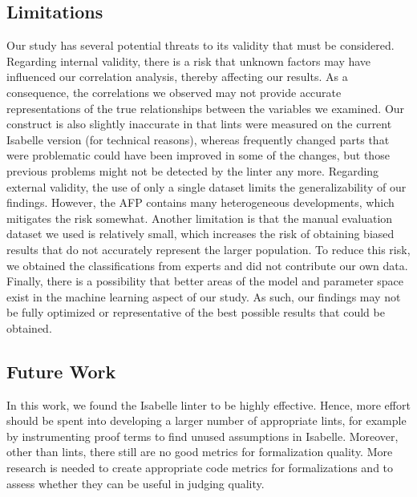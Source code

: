 \subsection{Limitations}
Our study has several potential threats to its validity that must be considered.
Regarding internal validity,
there is a risk that unknown factors may have influenced our correlation analysis,
thereby affecting our results.
As a consequence, the correlations we observed may not provide accurate representations of the true relationships between the variables we examined.
Our construct is also slightly inaccurate in that lints were measured on the current Isabelle version (for technical reasons),
whereas frequently changed parts that were problematic could have been improved in some of the changes,
but those previous problems might not be detected by the linter any more.
Regarding external validity, the use of only a single dataset limits the generalizability of our findings.
However, the AFP contains many heterogeneous developments, which mitigates the risk somewhat.
Another limitation is that the manual evaluation dataset we used is relatively small,
which increases the risk of obtaining biased results that do not accurately represent the larger population.
To reduce this risk,
we obtained the classifications from experts and did not contribute our own data.
Finally, there is a possibility that better areas of the model and parameter space exist in the machine learning aspect of our study.
As such, our findings may not be fully optimized or representative of the best possible results that could be obtained.

\subsection{Future Work}
In this work, we found the Isabelle linter to be highly effective.
Hence, more effort should be spent into developing a larger number of appropriate lints,
for example by instrumenting proof terms to find unused assumptions in Isabelle.
Moreover,
other than lints,
there still are no good metrics for formalization quality.
More research is needed to create appropriate code metrics for formalizations
and to assess whether they can be useful in judging quality.